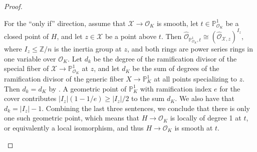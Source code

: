 \documentclass[12pt]{amsart}
\numberwithin{equation}{section}
\theoremstyle{definition}
\newtheorem{remark}[equation]{Remark}
\newcommand{\mc}[1]{\mathcal{#1}}
\newcommand{\ints}{\mathbb Z}
\newcommand{\proj}{\mathbb P}
\DeclareMathOperator{\divi}{div}
\DeclareMathOperator{\disc}{disc}
\DeclareMathOperator{\rad}{rad}
\begin{document}
\begin{proof}
\begin{enumerate}[\upshape (i)]
  For the ``only if'' direction, assume that
  $\mc{X} \to \mc{O}_K$ is smooth, let $t \in
  \proj^1_{\mc{O}_K}$ be a closed point of $H$, and
  let $z \in \mc{X}$ be a point above $t$.  Then $\hat{\mc{O}}_{\proj^1_{\mc{O}_K},
    t} \cong (\hat{\mc{O}}_{\mc{X}, z})^{I_z}$, where $I_z \leq \ints/n$ is the inertia
  group at $z$, and both rings are power series rings in one variable
  over $\mc{O}_K$. Let $d_k$ be the degree of the ramification divisor
  of the special fiber of $\mc{X} \to \proj^1_{\mc{O}_K}$ at $z$, and
  let $d_K$
  be the sum of degrees of the ramification divisor of the generic fiber $X \to \proj^1_{K}$ at all points
  specializing to $z$. Then $d_k = d_K$ by \cite[I, Claim 3.2]{GM}. A
  geometric point of $\proj^1_K$ with ramification index $e$ for the
  cover contributes $|I_z|(1 - 1/e) \geq |I_z|/2$ to the sum $d_K$.
  We also have that $d_k = |I_z| - 1$. Combining the last three sentences, we conclude that there
  is only one such geometric point, which means that $H \to \mc{O}_K$
  is locally of degree 1 at $t$, or equivalently a local isomorphism, and thus $H \to \mc{O}_K$ is smooth at $t$. \qedhere   
 \end{enumerate}
  \end{proof}

\end{document}
